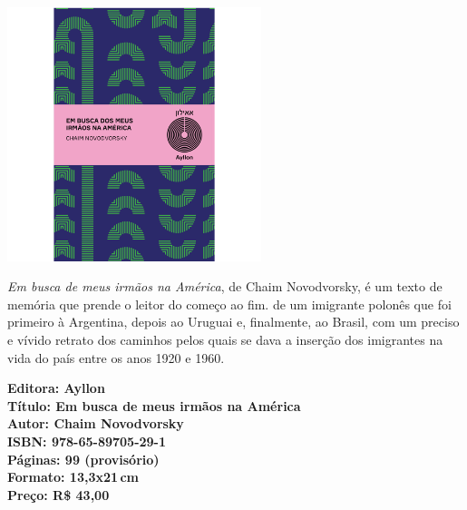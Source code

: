 \begin{center}
\hspace*{-3.6cm}
\hspace*{3.1cm}\includegraphics[width=74mm]{./CAPAS/AYLLON_AMERICA.jpg}
\end{center}
\hspace*{-7cm}\hrulefill\hspace*{-7cm}
\medskip

\noindent{}\textit{Em busca de meus irmãos na América}, de Chaim Novodvorsky, é um texto de memória que prende o leitor do começo ao fim.  de um imigrante polonês que foi primeiro à Argentina, depois ao Uruguai e, finalmente, ao Brasil, com um preciso e vívido retrato dos caminhos pelos quais se dava a inserção dos imigrantes na vida do país entre os anos 1920 e 1960. 

\vfill
\noindent\begin{minipage}[c]{1\linewidth}
{\small\textbf{
\hspace*{-.1cm}Editora: Ayllon\\
Título: Em busca de meus irmãos na América\\
Autor: Chaim Novodvorsky\\ 
ISBN: 978-65-89705-29-1\\
Páginas: 99 (provisório)\\
Formato: 13,3x21\,cm\\
Preço: R\$ 43,00\\
}}
\end{minipage}
\pagebreak

\vspace*{1.5cm}
\bigskip

